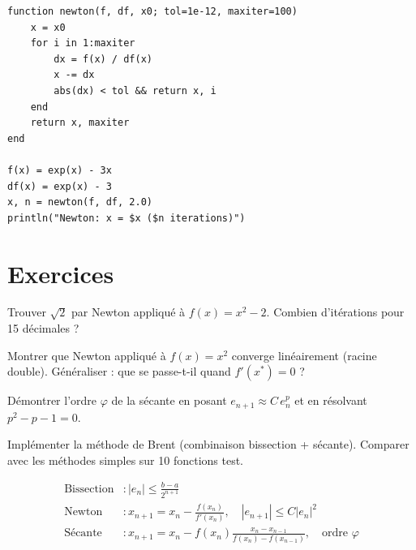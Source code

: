 \begin{codeblock}[title=\textbf{Julia}]
\begin{verbatim}
function newton(f, df, x0; tol=1e-12, maxiter=100)
    x = x0
    for i in 1:maxiter
        dx = f(x) / df(x)
        x -= dx
        abs(dx) < tol && return x, i
    end
    return x, maxiter
end

f(x) = exp(x) - 3x
df(x) = exp(x) - 3
x, n = newton(f, df, 2.0)
println("Newton: x = $x ($n iterations)")
\end{verbatim}
\end{codeblock}

\section{Exercices}

\begin{exercice}[$\star$]
Trouver $\sqrt{2}$ par Newton appliqu\'e \`a $f(x)=x^2-2$. Combien d'it\'erations pour 15 d\'ecimales ?
\end{exercice}

\begin{exercice}[$\star\star$]
Montrer que Newton appliqu\'e \`a $f(x)=x^2$ converge lin\'eairement (racine double). G\'en\'eraliser : que se passe-t-il quand $f'(x^*)=0$ ?
\end{exercice}

\begin{exercice}[$\star\star$]
D\'emontrer l'ordre $\varphi$ de la s\'ecante en posant $e_{n+1}\approx C\,e_n^p$ et en r\'esolvant $p^2-p-1=0$.
\end{exercice}

\begin{exercice}
Impl\'ementer la m\'ethode de Brent (combinaison bissection + s\'ecante). Comparer avec les m\'ethodes simples sur 10 fonctions test.
\end{exercice}

\begin{formules}
\begin{align*}
\text{Bissection} &: |e_n|\leq\frac{b-a}{2^{n+1}} \\
\text{Newton} &: x_{n+1}=x_n-\frac{f(x_n)}{f'(x_n)},\quad |e_{n+1}|\leq C|e_n|^2 \\
\text{S\'ecante} &: x_{n+1}=x_n-f(x_n)\frac{x_n-x_{n-1}}{f(x_n)-f(x_{n-1})},\quad \text{ordre }\varphi
\end{align*}
\end{formules}
